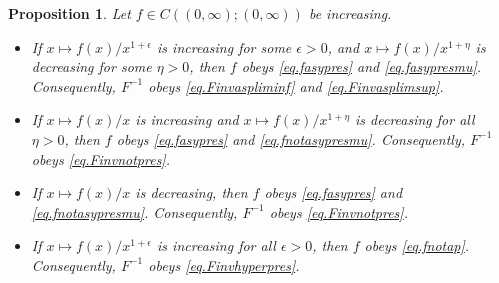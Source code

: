 \documentclass[a4paper,10pt,reqno]{amsart}
\numberwithin{equation}{section}
\newtheorem{proposition}{Proposition}
\theoremstyle{definition}
\theoremstyle{remark}
\DeclareMathOperator{\1}{\mathbbm 1}
\begin{document}
	\begin{proposition}
		Let $f\in C((0,\infty);(0,\infty))$ be increasing. 
		\begin{itemize}
			\item[(i)] If $x\mapsto f(x)/x^{1+\epsilon}$ is increasing for some  $\epsilon>0$, and  $x\mapsto f(x)/x^{1+\eta}$ is decreasing for some $\eta>0$, then $f$ obeys \eqref{eq.fasypres} and \eqref{eq.fasypresmu}. Consequently, $F^{-1}$ obeys \eqref{eq.Finvaspliminf} and \eqref{eq.Finvasplimsup}. 
			\item[(ii)] If $x\mapsto f(x)/x$ is increasing and $x\mapsto f(x)/x^{1+\eta}$ is decreasing for all $\eta>0$, then $f$ obeys \eqref{eq.fasypres} and \eqref{eq.fnotasypresmu}. Consequently, $F^{-1}$ obeys \eqref{eq.Finvnotpres}. 
			\item[(iii)] If $x\mapsto f(x)/x$ is decreasing, then $f$ obeys \eqref{eq.fasypres} and \eqref{eq.fnotasypresmu}. Consequently, $F^{-1}$ obeys \eqref{eq.Finvnotpres}. 
			\item[(iv)] If $x\mapsto f(x)/x^{1+\epsilon}$ is increasing for all $\epsilon>0$, then $f$ obeys \eqref{eq.fnotap}. Consequently, 
			$F^{-1}$ obeys \eqref{eq.Finvhyperpres}. 
		\end{itemize}
	\end{proposition}
\end{document}

